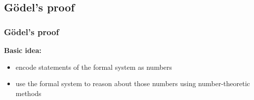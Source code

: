 %

\subsection{Gödel's proof}

\begin{frame}
    \frametitle{Gödel's proof}

    \textbf{Basic idea:}
    \begin{itemize}
        \item encode statements of the formal system as numbers
        \item use the formal system to reason about those numbers using number-theoretic methods
    \end{itemize}
\end{frame}

